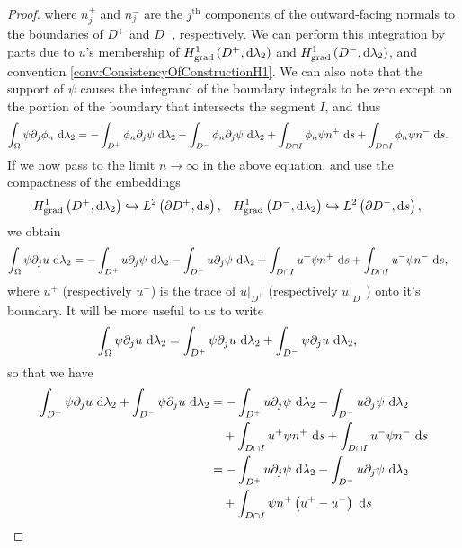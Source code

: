 \documentclass[11pt]{report}
\begin{document}
\begin{proof}
	where $n_j^+$ and $n_j^-$ are the $j^{\text{th}}$ components of the outward-facing normals to the boundaries of $D^+$ and $D^-$, respectively.
	We can perform this integration by parts due to $u$'s membership of $H^1_\mathrm{grad}\left( D^+, \mathrm{d}\lambda_2 \right)$ and $H^1_\mathrm{grad}\left( D^-, \mathrm{d}\lambda_2 \right)$, and convention \ref{conv:ConsistencyOfConstructionH1}.
	We can also note that the support of $\psi$ causes the integrand of the boundary integrals to be zero except on the portion of the boundary that intersects the segment $I$, and thus
	\begin{align*}
		\int_{\Omega}\psi\partial_j\phi_n \ \mathrm{d}\lambda_2
		&= -\int_{D^+}\phi_n\partial_j\psi \ \mathrm{d}\lambda_2 -\int_{D^-}\phi_n\partial_j\psi \ \mathrm{d}\lambda_2 + \int_{D \cap I}\phi_n\psi n^+ \ \mathrm{d}s + \int_{D \cap I}\phi_n\psi n^- \ \mathrm{d}s.
	\end{align*}
	If we now pass to the limit $n\rightarrow\infty$ in the above equation, and use the compactness of the embeddings
	\begin{align*}
		H^1_\mathrm{grad}\left( D^+, \mathrm{d}\lambda_2 \right)\hookrightarrow L^{2}\left( \partial D^+,\mathrm{d}s \right), &\quad H^1_\mathrm{grad}\left( D^-, \mathrm{d}\lambda_2 \right)\hookrightarrow L^{2}\left( \partial D^-,\mathrm{d}s \right),
	\end{align*}
	we obtain
	\begin{align*}
		\int_{\Omega}\psi\partial_j u \ \mathrm{d}\lambda_2
		&= -\int_{D^+}u\partial_j\psi \ \mathrm{d}\lambda_2 -\int_{D^-}u\partial_j\psi \ \mathrm{d}\lambda_2 + \int_{D \cap I}u^{+}\psi n^+ \ \mathrm{d}s + \int_{D \cap I}u^{-}\psi n^- \ \mathrm{d}s,
	\end{align*}
	where $u^+$ (respectively $u^-$) is the trace of $u\vert_{D^+}$ (respectively $u\vert_{D^-}$) onto it's boundary.
	It will be more useful to us to write
	\begin{align*}
		\int_{\Omega}\psi\partial_j u \ \mathrm{d}\lambda_2
		&= \int_{D^+}\psi\partial_j u \ \mathrm{d}\lambda_2 + \int_{D^-}\psi\partial_j u \ \mathrm{d}\lambda_2,
	\end{align*}
	so that we have
	\begin{align*}
		\integral{D^+}{\psi\partial_j u}{\lambda_2} + \integral{D^-}{\psi\partial_j u}{\lambda_2}
		&= -\integral{D^+}{u\partial_j\psi}{\lambda_2} -\integral{D^-}{u\partial_j\psi}{\lambda_2} \\
		&\quad + \integral{D \cap I}{u^{+}\psi n^+}{s} + \integral{D \cap I}{u^{-}\psi n^-}{s} \\
		&= -\integral{D^+}{u\partial_j\psi}{\lambda_2} -\integral{D^-}{u\partial_j\psi}{\lambda_2} \\
		&\quad + \integral{D \cap I}{\psi n^+\bracs{u^{+} - u^{-}}}{s}

\end{align*}
\end{proof}
\end{document}
